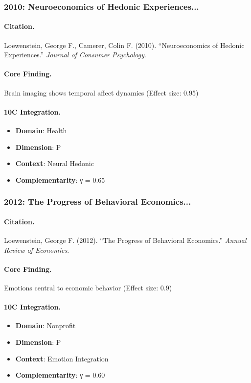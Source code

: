 \subsubsection{2010: Neuroeconomics of Hedonic Experiences...}

\paragraph{Citation.}
Loewenstein, George F., Camerer, Colin F. (2010). ``Neuroeconomics of Hedonic Experiences.''
\textit{Journal of Consumer Psychology}.

\paragraph{Core Finding.}
Brain imaging shows temporal affect dynamics (Effect size: 0.95)

\paragraph{10C Integration.}
\begin{itemize}[nosep]
  \item \textbf{Domain}: Health
  \item \textbf{Dimension}: P
  \item \textbf{Context}: Neural Hedonic
  \item \textbf{Complementarity}: γ = 0.65
\end{itemize}

\subsubsection{2012: The Progress of Behavioral Economics...}

\paragraph{Citation.}
Loewenstein, George F. (2012). ``The Progress of Behavioral Economics.''
\textit{Annual Review of Economics}.

\paragraph{Core Finding.}
Emotions central to economic behavior (Effect size: 0.9)

\paragraph{10C Integration.}
\begin{itemize}[nosep]
  \item \textbf{Domain}: Nonprofit
  \item \textbf{Dimension}: P
  \item \textbf{Context}: Emotion Integration
  \item \textbf{Complementarity}: γ = 0.60
\end{itemize}

